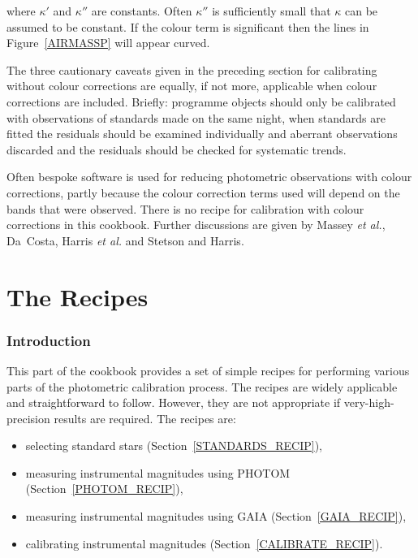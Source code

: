 \documentclass[twoside,11pt]{article}
\newcommand{\stardocinitials}  {SC}
\newcommand{\stardocnumber}    {6.4}
\newcommand{\stardocname}{\stardocinitials /\stardocnumber}
\newcommand{\xlabel}[1]{}
\begin{document}
where $\kappa '$ and $\kappa ''$ are constants.  Often $\kappa ''$ is
sufficiently small that $\kappa$ can be assumed to be constant.  If the
colour term is significant then the lines in Figure~\ref{AIRMASSP} will
appear curved.

The three cautionary caveats given in the preceding section for calibrating
without colour corrections are equally, if not more, applicable when colour
corrections are included.  Briefly: programme objects should only be
calibrated with observations of standards made on the same night, when
standards are fitted the residuals should be examined individually and
aberrant observations discarded and the residuals should be checked for
systematic trends.

Often bespoke software is used for reducing photometric observations with
colour corrections, partly because the colour correction terms used will
depend on the bands that were observed.  There is no recipe for
calibration with colour corrections in this cookbook.  Further
discussions are given by Massey {\it et al.}\/\cite{MASSEY89},
Da~Costa\cite{DACOSTA90}, Harris {\it et al.}\/\cite{HARRIS81} and
Stetson and Harris\cite{STETSON88}.


\cleardoublepage
\markboth{\stardocname}{\stardocname}
\part{The Recipes}
\markboth{\stardocname}{\stardocname}
\section{\xlabel{INTRO_RECIP}\label{INTRO_RECIP}Introduction}

This part of the cookbook provides a set of simple recipes for
performing various parts of the photometric calibration process.  The
recipes are widely applicable and straightforward to follow.  However,
they are not appropriate if very-high-precision results are required.
The recipes are:

\begin{itemize}

  \item selecting standard stars (Section~\ref{STANDARDS_RECIP}),

  \item measuring instrumental magnitudes using PHOTOM
   (Section~\ref{PHOTOM_RECIP}),

  \item measuring instrumental magnitudes using GAIA
   (Section~\ref{GAIA_RECIP}),

  \item calibrating instrumental magnitudes
   (Section~\ref{CALIBRATE_RECIP}).

\end{itemize}
\end{document}
